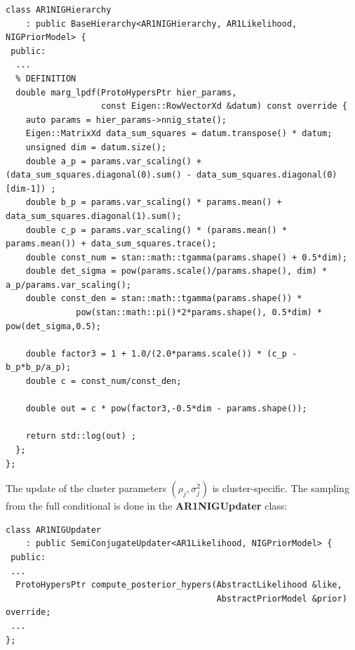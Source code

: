 \documentclass[12pt,a4paper]{article}
\begin{document}
\begin{lstlisting}
class AR1NIGHierarchy
    : public BaseHierarchy<AR1NIGHierarchy, AR1Likelihood, NIGPriorModel> {
 public:
  ...
  % DEFINITION
  double marg_lpdf(ProtoHypersPtr hier_params,
                   const Eigen::RowVectorXd &datum) const override {
    auto params = hier_params->nnig_state();
    Eigen::MatrixXd data_sum_squares = datum.transpose() * datum;
    unsigned dim = datum.size();
    double a_p = params.var_scaling() + (data_sum_squares.diagonal(0).sum() - data_sum_squares.diagonal(0)[dim-1]) ;
    double b_p = params.var_scaling() * params.mean() + data_sum_squares.diagonal(1).sum();
    double c_p = params.var_scaling() * (params.mean() * params.mean()) + data_sum_squares.trace();
    double const_num = stan::math::tgamma(params.shape() + 0.5*dim);
    double det_sigma = pow(params.scale()/params.shape(), dim) * a_p/params.var_scaling();
    double const_den = stan::math::tgamma(params.shape()) *
              pow(stan::math::pi()*2*params.shape(), 0.5*dim) * pow(det_sigma,0.5);

    double factor3 = 1 + 1.0/(2.0*params.scale()) * (c_p - b_p*b_p/a_p);
    double c = const_num/const_den;

    double out = c * pow(factor3,-0.5*dim - params.shape());

    return std::log(out) ;
  };
};
\end{lstlisting}

The update of the cluster parameters $(\rho_j,\sigma_j^2)$ is cluster-specific.
The sampling from the full conditional is done in the \textbf{AR1NIGUpdater} class:
\begin{lstlisting} 
class AR1NIGUpdater
    : public SemiConjugateUpdater<AR1Likelihood, NIGPriorModel> {
 public:
 ...
  ProtoHypersPtr compute_posterior_hypers(AbstractLikelihood &like,
                                          AbstractPriorModel &prior) override;
 ...
};
\end{lstlisting}
\end{document}
